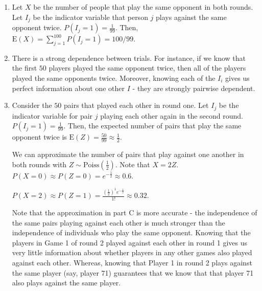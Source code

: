 \begin{enumerate}[label=(\alph*)]
\item Let $X$ be the number of people that play the same opponent in both
rounds. Let $I_{j}$ be the indicator variable that person $j$ plays against the
same opponent twice. $P(I_{j}=1) = \frac{1}{99}$. Then, $\text{E}(X) = \sum_
{j=1}^{100}P(I_{j}=1) = 100/99$.

\item There is a strong dependence between trials. For instance, if we know that
the first $50$ players played the same opponent twice, then all of the players
played the same opponents twice. Moreover, knowing each of the $I_{i}$ gives us perfect information about one other $I$ - they are strongly pairwise dependent.

\item Consider the $50$ pairs that played each other in round one. Let $I_{j}$
be the indicator variable for pair $j$ playing each other again in the second
round. $P(I_{j}=1) = \frac{1}{99}$. Then, the expected number of pairs that
play the same opponent twice is $\text{E}(Z) = \frac{50}{99} \approx \frac{1}{2}$.

We can approximate the number of pairs that play against one another in both
rounds with $Z \sim \text{Poiss}(\frac{1}{2})$. Note that $X=2Z$. $P(X = 0) \approx P(Z =
0) = e^{-\frac{1}{2}} \approx 0.6$.

$P(X = 2) \approx P(Z = 1) = \frac{(\frac{1}{2})^{1}e^{-\frac{1}{2}}}{1!}
\approx 0.32$.

Note that the approximation in part C is more accurate - the independence of the same pairs playing against each other is much stronger than the independence of individuals who play the same opponent. Knowing that the players in Game 1 of round 2 played against each other in round 1 gives us very little information about whether players in any other games also played against each other. Whereas, knowing that Player 1 in round 2 plays against the same player (say, player 71) guarantees that we know that that player 71 also plays against the same player.  
\end{enumerate}
